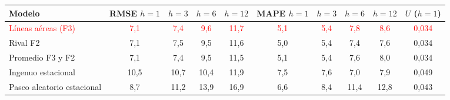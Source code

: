 \begin{tabular}{lccccccccc}
\toprule
Modelo & RMSE $h{=}1$ & $h{=}3$ & $h{=}6$ & $h{=}12$ & MAPE $h{=}1$ & $h{=}3$ & $h{=}6$ & $h{=}12$ & $U$ ($h{=}1$)
\\ \midrule
\textcolor{red}{L\'ineas a\'ereas (F3)} & \textcolor{red}{7{,}1} & \textcolor{red}{7{,}4} & \textcolor{red}{9{,}6} & \textcolor{red}{11{,}7} & \textcolor{red}{5{,}1} & \textcolor{red}{5{,}4} & \textcolor{red}{7{,}8} & \textcolor{red}{8{,}6} & \textcolor{red}{0{,}034} \\
Rival F2 & 7{,}1 & 7{,}5 & 9{,}5 & 11{,}6 & 5{,}0 & 5{,}4 & 7{,}4 & 7{,}6 & 0{,}034 \\
Promedio F3 y F2 & 7{,}1 & 7{,}4 & 9{,}5 & 11{,}5 & 5{,}1 & 5{,}4 & 7{,}6 & 8{,}0 & 0{,}034 \\
Ingenuo estacional & 10{,}5 & 10{,}7 & 10{,}4 & 11{,}9 & 7{,}5 & 7{,}6 & 7{,}0 & 7{,}9 & 0{,}049 \\
Paseo aleatorio estacional & 8{,}7 & 11{,}2 & 13{,}9 & 16{,}9 & 6{,}6 & 8{,}4 & 11{,}4 & 12{,}8 & 0{,}043 \\
\bottomrule
\end{tabular}
